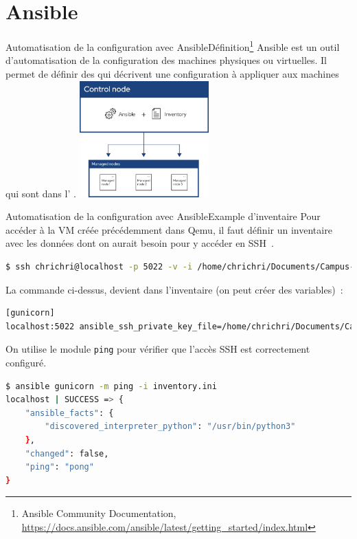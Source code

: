 \documentclass{beamer}
\begin{document}
    \section{Ansible}\label{sec:ansible}

    \begin{frame}{Automatisation de la configuration avec Ansible}{Définition\footnote{Ansible Community Documentation, \url{https://docs.ansible.com/ansible/latest/getting_started/index.html}}}
        Ansible est un outil d'automatisation de la configuration des machines physiques ou virtuelles.
        Il permet de définir des  qui décrivent une configuration à appliquer aux machines qui sont dans l' .
        \bigbreak
        \centering
        \includegraphics[width=5cm]{image/ansible}
    \end{frame}

    \begin{frame}[fragile]{Automatisation de la configuration avec Ansible}{Example d'inventaire}
        Pour accéder à la VM créée précédemment dans Qemu, il faut définir un inventaire avec les données dont on aurait besoin pour y accéder en SSH~.
        \begin{lstlisting}[language=bash,basicstyle=\ttfamily\tiny]
$ ssh chrichri@localhost -p 5022 -v -i /home/chrichri/Documents/Campus-St-Michel-IT/production-deployment/virt-ubuntu
        \end{lstlisting}
        La commande ci-dessus, devient dans l'inventaire (on peut créer des variables)~:
        \begin{lstlisting}[language=bash,basicstyle=\ttfamily\tiny]
[gunicorn]
localhost:5022 ansible_ssh_private_key_file=/home/chrichri/Documents/Campus-St-Michel-IT/production-deployment/virt-ubuntu ansible_ssh_user=chrichri
        \end{lstlisting}
        On utilise le module \lstinline{ping} pour vérifier que l'accès SSH est correctement configuré.
        \begin{lstlisting}[language=bash,basicstyle=\ttfamily\tiny]
$ ansible gunicorn -m ping -i inventory.ini
localhost | SUCCESS => {
    "ansible_facts": {
        "discovered_interpreter_python": "/usr/bin/python3"
    },
    "changed": false,
    "ping": "pong"
}
        \end{lstlisting}
    \end{frame}
\end{document}
